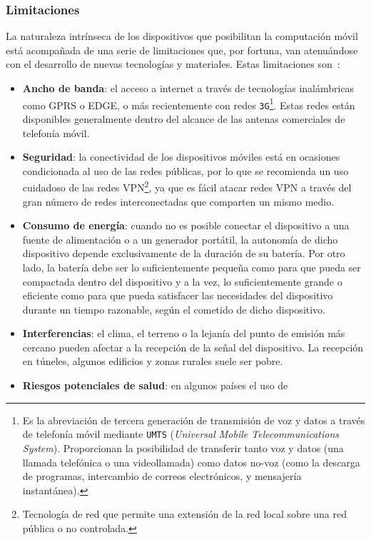   \subsubsection{Limitaciones}
La naturaleza intrínseca de los dispositivos que posibilitan la computación 
móvil está acompañada de una serie de limitaciones que, por fortuna, van
atenuándose con el desarrollo de nuevas tecnologías y materiales. Estas
limitaciones son~\cite{bib:wikiMobileComputing}:
\begin{itemize}
\item \textbf{Ancho de banda}: el acceso a internet a través de tecnologías
inalámbricas como \acs{GPRS} o \acs{EDGE}, o más recientemente con redes
\texttt{3G}\footnote{Es la abreviación de tercera generación de transmisión de 
voz y datos a través de telefonía móvil mediante \texttt{UMTS} (\emph{Universal 
Mobile Telecommunications System}). Proporcionan la posibilidad de transferir 
tanto voz y datos (una llamada telefónica o una videollamada) como datos no-voz 
(como la descarga de programas, intercambio de correos electrónicos, y 
mensajería instantánea).}. Estas redes están disponibles generalmente dentro
del alcance de las antenas comerciales de telefonía móvil.
\item \textbf{Seguridad}: la conectividad de los dispositivos móviles está
en ocasiones condicionada al uso de las redes públicas, por lo que se
recomienda un uso cuidadoso de las redes \acs{VPN}\footnote{Tecnología de red
que permite una extensión de la red local sobre una red pública o no
controlada.}, ya que es fácil atacar redes \acs{VPN} a través del gran número
de redes interconectadas que comparten un mismo medio.
\item \textbf{Consumo de energía}: cuando no es posible conectar el dispositivo
a una fuente de alimentación o a un generador portátil, la autonomía de dicho
dispositivo depende exclusivamente de la duración de su batería. Por otro lado,
la batería debe ser lo suficientemente pequeña como para que pueda ser
compactada dentro del dispositivo y a la vez, lo suficientemente grande o
eficiente como para que pueda satisfacer las necesidades del dispositivo
durante un tiempo razonable, según el cometido de dicho dispositivo.
\item \textbf{Interferencias}: el clima, el terreno o la lejanía del punto de
emisión más cercano pueden afectar a la recepción de la señal del dispositivo.
La recepción en túneles, algunos edificios y zonas rurales suele ser pobre.
\item \textbf{Riesgos potenciales de salud}: en algunos países el uso de

\end{itemize}
